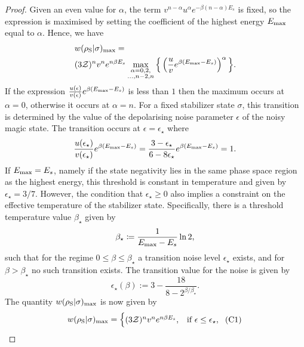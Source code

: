 \documentclass[pra,
aps,
twocolumn,
superscriptaddress,
groupedaddress,
nofootinbib,
reprint
]{revtex4-1}
\begin{document}
\begin{proof}
Given an even value for $\alpha$, the term $v^{n-\alpha} u^{\alpha} e^{-\beta (n-\alpha)E_s}$ is fixed, so the expression is maximised by setting the coefficient of the highest energy $E_{\rm{max}}$ equal to $\alpha$.
Hence, we have
\begin{align}
	&w(\rho_{\rm{S}} | \sigma)_{\rm{max}} = \nonumber\\
	&(3\mathcal{Z})^{n} v^n e^{n\beta E_s}\max\limits_{\substack{\alpha = 0,2, \\ \dots,n-2,n}}{\Big\{ \left( \frac{u}{v} e^{\beta (E_{\rm{max}} - E_s)} \right)^{\alpha} \Big\}}.
\end{align}
If the expression $\frac{u(\epsilon)}{v(\epsilon)} e^{\beta (E_{\rm{max}} - E_s)}$ is less than $1$ then the maximum occurs at $\alpha=0$, otherwise it occurs at $\alpha = n$. For a fixed stabilizer state $\sigma$, this transition is determined by the value of the depolarising noise parameter $\epsilon$ of the noisy magic state. The transition occurs at $\epsilon = \epsilon_\star$ where
\begin{equation}\label{eq:noise_transition}
	\frac{u(\epsilon_\star)}{v(\epsilon_\star)} e^{\beta (E_{\rm{max}} - E_s)} = \frac{3-\epsilon_\star}{6-8\epsilon_\star} e^{\beta (E_{\rm{max}} - E_s)} = 1.
\end{equation}
If $E_{\rm{max}} = E_s$, namely if the state negativity lies in the same phase space region as the highest energy, this threshold is constant in temperature and given by $\epsilon_{\star} = 3/7$. However, the condition that $\epsilon_\star \ge 0$ also implies a constraint on the effective temperature of the stabilizer state. Specifically, there is a threshold temperature value $\beta_\star$ given by
\begin{equation}
	\beta_{\star} \coloneqq \frac{1}{E_{\rm{max}} - E_s} \ln2,
\end{equation}
such that for the regime $0 \leq \beta \leq \beta_\star$ a transition noise level $\epsilon_\star$ exists, and for $\beta > \beta_\star$ no such transition exists. The transition value for the noise is given by
\begin{equation}
	\epsilon_{\star}(\beta) := 3 - \dfrac{18}{8-2^{\beta/\beta_\star}}.
\end{equation}
The quantity $w(\rho_{\rm{S}} | \sigma)_{\rm{max}}$ is now given by
\begin{equation*}
w(\rho_{\rm{S}} | \sigma)_{\rm{max}} =
	\begin{cases}
		(3\mathcal{Z})^{n} v^n e^{n\beta E_s}, &\mbox{if }\epsilon \leq \epsilon_{\star},\ \hspace{3pt}\rm{(C1)}	\\

\end{cases}
\end{equation*}
\end{proof}
\end{document}
